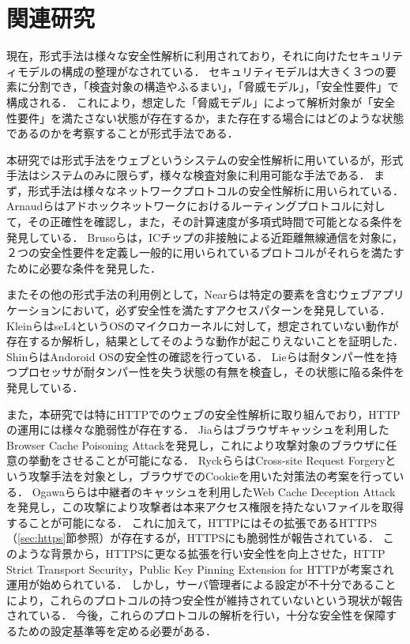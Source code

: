 \documentclass[12pt,a4paper]{jbook}
\begin{document}
\section{関連研究}
現在，形式手法は様々な安全性解析に利用されており，それに向けたセキュリティモデルの構成の整理がなされている\cite{security_modeling_and_analysis}．
セキュリティモデルは大きく３つの要素に分割でき，「検査対象の構造やふるまい」，「脅威モデル」，「安全性要件」で構成される．
これにより，想定した「脅威モデル」によって解析対象が「安全性要件」を満たさない状態が存在するか，また存在する場合にはどのような状態であるのかを考察することが形式手法である．


本研究では形式手法をウェブというシステムの安全性解析に用いているが，形式手法はシステムのみに限らず，様々な検査対象に利用可能な手法である．
まず，形式手法は様々なネットワークプロトコルの安全性解析に用いられている．
Arnaudら\cite{modeling-and-verifying-ad-hoc}はアドホックネットワークにおけるルーティングプロトコルに対して，その正確性を確認し，また，その計算速度が多項式時間で可能となる条件を発見している．
Brusoら\cite{formal-verification-of-privacy-for}は，ICチップの非接触による近距離無線通信\cite{formal-verification-of-privacy-for}を対象に，２つの安全性要件を定義し一般的に用いられているプロトコルがそれらを満たすために必要な条件を発見した．

またその他の形式手法の利用例として，Nearら\cite{finding_security_bugs_in_web}は特定の要素を含むウェブアプリケーションにおいて，必ず安全性を満たすアクセスパターンを発見している．
Kleinら\cite{sel4_formal_verification_of_an}はseL4というOSのマイクロカーネルに対して，想定されていない動作が存在するか解析し，結果としてそのような動作が起こりえないことを証明した．
Shinら\cite{towards_formal_analysis_of_the}はAndoroid OSの安全性の確認を行っている．
Lieら\cite{specifying_and_verifying_hardware_for_tamper}は耐タンパー性を持つプロセッサが耐タンパー性を失う状態の有無を検査し，その状態に陥る条件を発見している．

また，本研究では特にHTTPでのウェブの安全性解析に取り組んでおり，HTTPの運用には様々な脆弱性が存在する．
Jiaら\cite{bcpattack}はブラウザキャッシュを利用したBrowser Cache Poisoning Attackを発見し，これにより攻撃対象のブラウザに任意の挙動をさせることが可能になる．
Ryckら\cite{cookie-model}らはCross-site Request Forgeryという攻撃手法を対象とし，ブラウザでのCookieを用いた対策法の考案を行っている．
Ogawaら\cite{WCD}らは中継者のキャッシュを利用したWeb Cache Deception Attackを発見し，この攻撃により攻撃者は本来アクセス権限を持たないファイルを取得することが可能になる．
これに加えて，HTTPにはその拡張であるHTTPS（\ref{sec:https}節参照）が存在するが，HTTPSにも脆弱性が報告されている\cite{poodle}．
このような背景から，HTTPSに更なる拡張を行い安全性を向上させた，HTTP Strict Transport Security\cite{hsts}，Public Key Pinning Extension for HTTP\cite{hpkp}が考案され運用が始められている．
しかし，サーバ管理者による設定が不十分であることにより，これらのプロトコルの持つ安全性が維持されていないという現状が報告されている\cite{hstshpkp}．
今後，これらのプロトコルの解析を行い，十分な安全性を保障するための設定基準等を定める必要がある．
\end{document}
